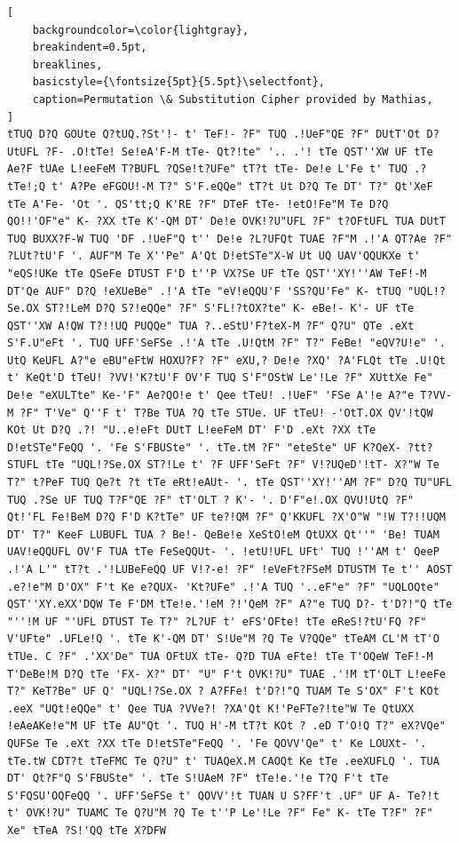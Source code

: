 \documentclass{uva-inf-presentation}
\begin{document}
\begin{frame}[containsverbatim]
\begin{lstlisting}[
    backgroundcolor=\color{lightgray},
    breakindent=0.5pt,
    breaklines,
    basicstyle={\fontsize{5pt}{5.5pt}\selectfont},
    caption=Permutation \& Substitution Cipher provided by Mathias,
]
tTUQ D?Q GOUte Q?tUQ.?St'!- t' TeF!- ?F" TUQ .!UeF"QE ?F" DUtT'Ot D?UtUFL ?F- .O!tTe! Se!eA'F-M tTe- Qt?!te" '.. .'! tTe QST''XW UF tTe Ae?F tUAe L!eeFeM T?BUFL ?QSe!t?UFe" tT?t tTe- De!e L'Fe t' TUQ .?tTe!;Q t' A?Pe eFGOU!-M T?" S'F.eQQe" tT?t Ut D?Q Te DT' T?" Qt'XeF tTe A'Fe- 'Ot '. QS'tt;Q K'RE ?F" DTeF tTe- !etO!Fe"M Te D?Q QO!!'OF"e" K- ?XX tTe K'-QM DT' De!e OVK!?U"UFL ?F" t?OFtUFL TUA DUtT TUQ BUXX?F-W TUQ 'DF .!UeF"Q t'' De!e ?L?UFQt TUAE ?F"M .!'A QT?Ae ?F" ?LUt?tU'F '. AUF"M Te X''Pe" A'Qt D!etSTe"X-W Ut UQ UAV'QQUKXe t' "eQS!UKe tTe QSeFe DTUST F'D t''P VX?Se UF tTe QST''XY!''AW TeF!-M DT'Qe AUF" D?Q !eXUeBe" .!'A tTe "eV!eQQU'F 'SS?QU'Fe" K- tTUQ "UQL!?Se.OX ST?!LeM D?Q S?!eQQe" ?F" S'FL!?tOX?te" K- eBe!- K'- UF tTe QST''XW A!QW T?!!UQ PUQQe" TUA ?..eStU'F?teX-M ?F" Q?U" QTe .eXt S'F.U"eFt '. TUQ UFF'SeFSe .!'A tTe .U!QtM ?F" T?" FeBe! "eQV?U!e" '. UtQ KeUFL A?"e eBU"eFtW HOXU?F? ?F" eXU,? De!e ?XQ' ?A'FLQt tTe .U!Qt t' KeQt'D tTeU! ?VV!'K?tU'F OV'F TUQ S'F"OStW Le'!Le ?F" XUttXe Fe" De!e "eXULTte" Ke-'F" Ae?QO!e t' Qee tTeU! .!UeF" 'FSe A'!e A?"e T?VV-M ?F" T'Ve" Q''F t' T?Be TUA ?Q tTe STUe. UF tTeU! -'OtT.OX QV'!tQW KOt Ut D?Q .?! "U..e!eFt DUtT L!eeFeM DT' F'D .eXt ?XX tTe D!etSTe"FeQQ '. 'Fe S'FBUSte" '. tTe.tM ?F" "eteSte" UF K?QeX- ?tt?STUFL tTe "UQL!?Se.OX ST?!Le t' ?F UFF'SeFt ?F" V!?UQeD'!tT- X?"W Te T?" t?PeF TUQ Qe?t ?t tTe eRt!eAUt- '. tTe QST''XY!''AM ?F" D?Q TU"UFL TUQ .?Se UF TUQ T?F"QE ?F" tT'OLT ? K'- '. D'F"e!.OX QVU!UtQ ?F" Qt!'FL Fe!BeM D?Q F'D K?tTe" UF te?!QM ?F" Q'KKUFL ?X'O"W "!W T?!!UQM DT' T?" KeeF LUBUFL TUA ? Be!- QeBe!e XeStO!eM QtUXX Qt''" 'Be! TUAM UAV!eQQUFL OV'F TUA tTe FeSeQQUt- '. !etU!UFL UFt' TUQ !''AM t' QeeP .!'A L'" tT?t .'!LUBeFeQQ UF V!?-e! ?F" !eVeFt?FSeM DTUSTM Te t'' AOST .e?!e"M D'OX" F't Ke e?QUX- 'Kt?UFe" .!'A TUQ '..eF"e" ?F" "UQLOQte" QST''XY.eXX'DQW Te F'DM tTe!e.'!eM ?!'QeM ?F" A?"e TUQ D?- t'D?!"Q tTe "''!M UF "'UFL DTUST Te T?" ?L?UF t' eFS'OFte! tTe eReS!?tU'FQ ?F" V'UFte" .UFLe!Q '. tTe K'-QM DT' S!Ue"M ?Q Te V?QQe" tTeAM CL'M tT'O tTUe. C ?F" .'XX'De" TUA OFtUX tTe- Q?D TUA eFte! tTe T'OQeW TeF!-M T'DeBe!M D?Q tTe 'FX- X?" DT' "U" F't OVK!?U" TUAE .'!M tT'OLT L!eeFe T?" KeT?Be" UF Q' "UQL!?Se.OX ? A?FFe! t'D?!"Q TUAM Te S'OX" F't KOt .eeX "UQt!eQQe" t' Qee TUA ?VVe?! ?XA'Qt K!'PeFTe?!te"W Te QtUXX !eAeAKe!e"M UF tTe AU"Qt '. TUQ H'-M tT?t KOt ? .eD T'O!Q T?" eX?VQe" QUFSe Te .eXt ?XX tTe D!etSTe"FeQQ '. 'Fe QOVV'Qe" t' Ke LOUXt- '. tTe.tW CDT?t tTeFMC Te Q?U" t' TUAQeX.M CAOQt Ke tTe .eeXUFLQ '. TUA DT' Qt?F"Q S'FBUSte" '. tTe S!UAeM ?F" tTe!e.'!e T?Q F't tTe S'FQSU'OQFeQQ '. UFF'SeFSe t' QOVV'!t TUAN U S?FF't .UF" UF A- Te?!t t' OVK!?U" TUAMC Te Q?U"M ?Q Te t''P Le'!Le ?F" Fe" K- tTe T?F" ?F" Xe" tTeA ?S!'QQ tTe X?DFW
\end{lstlisting}
\end{frame}
\end{document}
